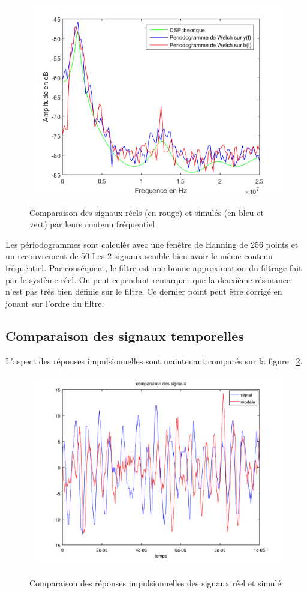 \documentclass[a4paper]{article}
\begin{document}
\begin{figure}[!h]
	\centering
	\includegraphics[scale=0.7]{dsp1.png}
    \label{dsp}
    \caption{Comparaison des signaux réels (en rouge) et simulés (en bleu et vert) par leurs contenu fréquentiel}
\end{figure}
Les périodogrammes sont calculés avec une fenêtre de Hanning de 256 points et un recouvrement de 50%
Les 2 signaux semble bien avoir le même contenu fréquentiel. Par conséquent, le filtre est une bonne approximation du filtrage fait par le système réel.
On peut cependant remarquer que la deuxième résonance n'est pas très bien définie sur le filtre. Ce dernier point peut être corrigé en jouant sur l'ordre du filtre.

\subsection{Comparaison des signaux temporelles}
L'aspect des réponses impulsionnelles sont maintenant comparés sur la figure ~\ref{comp_temps}.

\begin{figure}[!h]
	\centering
	\includegraphics[scale=0.5]{comp_temps.png}
    \label{comp_temps}
    \caption{Comparaison des réponses impulsionnelles des signaux réel et simulé }
\end{figure}
\end{document}
